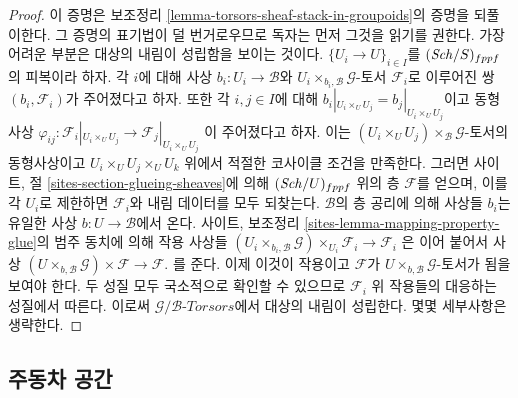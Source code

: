 \begin{proof}
이 증명은 보조정리 \ref{lemma-torsors-sheaf-stack-in-groupoids}의 증명을
되풀이한다. 그 증명의 표기법이 덜 번거로우므로 독자는 먼저 그것을 읽기를
권한다. 가장 어려운 부분은 대상의 내림이 성립함을 보이는 것이다.
$\{U_i \to U\}_{i \in I}$를 $(\mathit{Sch}/S)_{fppf}$의 피복이라 하자.
각 $i$에 대해 사상 $b_i : U_i \to \mathcal{B}$와
$U_i \times_{b_i, \mathcal{B}} \mathcal{G}$-토서 $\mathcal{F}_i$로 이루어진
쌍 $(b_i, \mathcal{F}_i)$가 주어졌다고 하자. 또한 각 $i, j \in I$에 대해
$b_i|_{U_i \times_U U_j} = b_j|_{U_i \times_U U_j}$이고 동형사상
$\varphi_{ij} :
\mathcal{F}_i|_{U_i \times_U U_j} \to \mathcal{F}_j|_{U_i \times_U U_j}$
이 주어졌다고 하자. 이는
$(U_i \times_U U_j) \times_\mathcal{B} \mathcal{G}$-토서의 동형사상이고
$U_i \times_U U_j \times_U U_k$ 위에서 적절한 코사이클 조건을 만족한다.
그러면 사이트, 절 \ref{sites-section-glueing-sheaves}에 의해
$(\mathit{Sch}/U)_{fppf}$ 위의 층 $\mathcal{F}$를 얻으며, 이를 각 $U_i$로 제한하면
$\mathcal{F}_i$와 내림 데이터를 모두 되찾는다. $\mathcal{B}$의 층 공리에
의해 사상들 $b_i$는 유일한 사상 $b : U \to \mathcal{B}$에서 온다.
사이트, 보조정리 \ref{sites-lemma-mapping-property-glue}의 범주 동치에 의해
작용 사상들
$(U_i \times_{b_i, \mathcal{B}} \mathcal{G}) \times_{U_i} \mathcal{F}_i
\to \mathcal{F}_i$
은 이어 붙어서 사상
$(U \times_{b, \mathcal{B}} \mathcal{G}) \times \mathcal{F} \to \mathcal{F}$.
를 준다. 이제 이것이 작용이고 $\mathcal{F}$가
$U \times_{b, \mathcal{B}} \mathcal{G}$-토서가 됨을 보여야 한다.
두 성질 모두 국소적으로 확인할 수 있으므로 $\mathcal{F}_i$ 위 작용들의
대응하는 성질에서 따른다. 이로써
$\mathcal{G}/\mathcal{B}\textit{-Torsors}$에서 대상의 내림이 성립한다.
몇몇 세부사항은 생략한다.
\end{proof}



\subsection{주동차 공간}
\label{subsection-principal-homogeneous-spaces}

